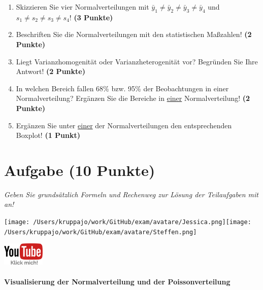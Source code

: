 \documentclass[a4paper, 9pt]{scrartcl}\usepackage[]{graphicx}\usepackage[]{xcolor}
\begin{document}
\begin{enumerate}
\item Skizzieren Sie vier Normalverteilungen mit $\bar{y}_1 \neq \bar{y}_2 \neq \bar{y}_3 \neq \bar{y}_4$ und $s_1 \neq s_2 \neq s_3 \neq s_4$! \textbf{(3 Punkte)}
\item Beschriften Sie die Normalverteilungen mit den statistischen Maßzahlen! \textbf{(2 Punkte)}
\item Liegt Varianzhomogenität oder Varianzheterogenität vor? Begründen Sie Ihre Antwort! \textbf{(2 Punkte)}
\item In welchen Bereich fallen 68\% bzw. 95\% der Beobachtungen in einer Normalverteilung? Ergänzen Sie die Bereiche in \underline{einer} Normalverteilung! \textbf{(2 Punkte)}
\item Ergänzen Sie unter \underline{einer} der Normalverteilungen den entsprechenden Boxplot! \textbf{(1 Punkt)}
\end{enumerate}

 
\clearpage

\section{Aufgabe \hfill (10 Punkte)}

\textit{Geben Sie grundsätzlich Formeln und Rechenweg zur Lösung der Teilaufgaben mit an!} \\[1Ex]
 

 
\begin{minipage}[t]{0.5\textwidth}
\texttt{[image: /Users/kruppajo/work/GitHub/exam/avatare/Jessica.png]}\hspace{-4mm}\texttt{[image: /Users/kruppajo/work/GitHub/exam/avatare/Steffen.png]}
\end{minipage}
\begin{minipage}[t]{0.5\textwidth}
\hfill
\href{https://youtu.be/MiD42k4l5Ag}{\includegraphics[width = 2cm]{img/youtube}}
\end{minipage}



\paragraph{Visualisierung der Normalverteilung und der Poissonverteilung}
\end{document}
